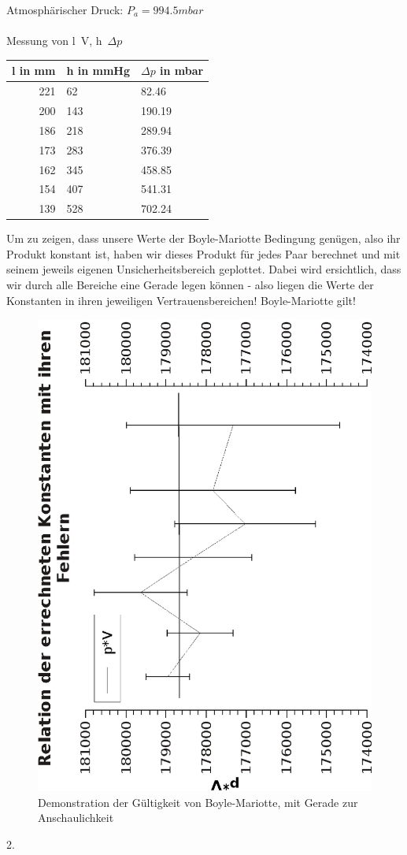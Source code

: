 \documentclass{article}
\begin{document}
Atmosphärischer Druck: $P_a=994.5mbar$\\
\\
Messung von l~V, h~$\Delta p$
\begin{center}
\begin{tabular}{r|l|l}
l in mm & h in mmHg & $\Delta p$ in mbar\\
\hline
221 & 62 & 82.46\\
200 & 143 & 190.19\\
186 & 218 & 289.94\\
173 & 283 & 376.39\\
162 & 345 & 458.85\\
154 & 407 & 541.31\\
139 & 528 & 702.24\\
\end{tabular}
\end{center}
Um zu zeigen, dass unsere Werte der Boyle-Mariotte Bedingung genügen, also ihr Produkt konstant ist, haben wir dieses Produkt für jedes Paar berechnet und mit seinem jeweils eigenen Unsicherheitsbereich geplottet. Dabei wird ersichtlich, dass wir durch alle Bereiche eine Gerade legen können - also liegen die Werte der Konstanten in ihren jeweiligen Vertrauensbereichen! Boyle-Mariotte gilt!
\begin{center}
\begin{figure}
\caption{Demonstration der Gültigkeit von Boyle-Mariotte, mit Gerade zur Anschaulichkeit}
\includegraphics[scale=0.7, angle=-90]{konstanten.eps}
\end{figure}
\end{center}
2.
\end{document}
